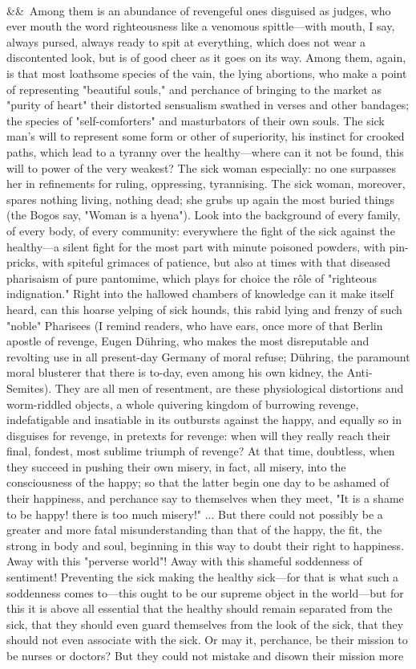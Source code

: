 \documentclass[12pt]{article}
\newcommand{\para}[1][]{\par\noindent\ifx&#1&\else\textsuperscript{\footnotesize #1}~\fi}
\begin{document}
\para Among them is an abundance of revengeful ones disguised as judges, who ever mouth the word righteousness like a venomous spittle---with mouth, I say, always pursed, always ready to spit at everything, which does not wear a discontented look, but is of good cheer as it goes on its way. Among them, again, is that most loathsome species of the vain, the lying abortions, who make a point of representing "beautiful souls," and perchance of bringing to the market as "purity of heart" their distorted sensualism swathed in verses and other bandages; the species of "self-comforters" and masturbators of their own souls. The sick man's will to represent some form or other of superiority, his instinct for crooked paths, which lead to a tyranny over the healthy---where can it not be found, this will to power of the very weakest? The sick woman especially: no one surpasses her in refinements for ruling, oppressing, tyrannising. The sick woman, moreover, spares nothing living, nothing dead; she grubs up again the most buried things (the Bogos say, "Woman is a hyena"). Look into the background of every family, of every body, of every community: everywhere the fight of the sick against the healthy---a silent fight for the most part with minute poisoned powders, with pin-pricks, with spiteful grimaces of patience, but also at times with that diseased pharisaism of pure pantomime, which plays for choice the rôle of "righteous indignation." Right into the hallowed chambers of knowledge can it make itself heard, can this hoarse yelping of sick hounds, this rabid lying and frenzy of such "noble" Pharisees (I remind readers, who have ears, once more of that Berlin apostle of revenge, Eugen Dühring, who makes the most disreputable and revolting use in all present-day Germany of moral refuse; Dühring, the paramount moral blusterer that there is to-day, even among his own kidney, the Anti-Semites). They are all men of resentment, are these physiological distortions and worm-riddled objects, a whole quivering kingdom of burrowing revenge, indefatigable and insatiable in its outbursts against the happy, and equally so in disguises for revenge, in pretexts for revenge: when will they really reach their final, fondest, most sublime triumph of revenge? At that time, doubtless, when they succeed in pushing their own misery, in fact, all misery, into the consciousness of the happy; so that the latter begin one day to be ashamed of their happiness, and perchance say to themselves when they meet, "It is a shame to be happy! there is too much misery!" ... But there could not possibly be a greater and more fatal misunderstanding than that of the happy, the fit, the strong in body and soul, beginning in this way to doubt their right to happiness. Away with this "perverse world"! Away with this shameful soddenness of sentiment! Preventing the sick making the healthy sick---for that is what such a soddenness comes to---this ought to be our supreme object in the world---but for this it is above all essential that the healthy should remain separated from the sick, that they should even guard themselves from the look of the sick, that they should not even associate with the sick. Or may it, perchance, be their mission to be nurses or doctors? But they could not mistake and disown their mission more 
\end{document}
